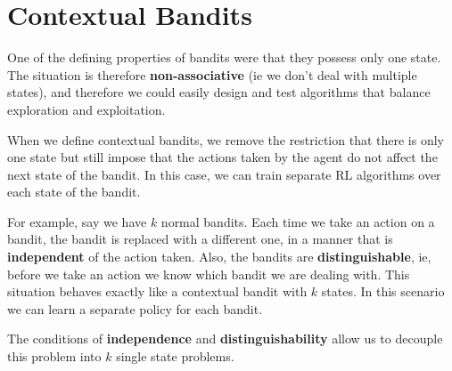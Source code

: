 \documentclass[12pt]{report}
\begin{document}
\section{Contextual Bandits}
One of the defining properties of bandits were that they possess only one state. The situation is therefore \textbf{non-associative} (ie we don't deal with multiple states), and therefore we could easily design 
and test algorithms that balance exploration and exploitation.

When we define contextual bandits, we remove the restriction that there is only one state but still impose that the actions taken by the agent do not affect the next state of the bandit. In this case, we can train separate RL algorithms 
over each state of the bandit.

For example, say we have $k$ normal bandits. Each time we take an action on a bandit, the bandit is replaced with a different one, in a manner that is \textbf{independent} of the action taken. Also, the bandits are \textbf{distinguishable}, 
ie, before we take an action we know which bandit we are dealing with. This situation behaves exactly like a contextual bandit with $k$ states. In this scenario we can learn a separate policy for each bandit.

The conditions of \textbf{independence} and \textbf{distinguishability} allow us to decouple this problem into $k$ single state problems.
\end{document}
